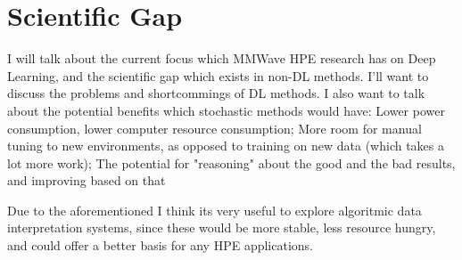 \section{Scientific Gap}
\label{section: introduction - scientific gap}


I will talk about the current focus which MMWave HPE research has on Deep Learning, and the scientific gap which exists in non-DL methods.
I'll want to discuss the problems and shortcommings of DL methods.
I also want to talk about the potential benefits which stochastic methods would have: 
Lower power consumption, lower computer resource consumption; 
More room for manual tuning to new environments, as opposed to training on new data (which takes a lot more work); 
The potential for "reasoning" about the good and the bad results, and improving based on that

Due to the aforementioned I think its very useful to explore algoritmic data interpretation systems, since these would be more stable, less resource hungry, and could offer a better basis for any HPE applications.

